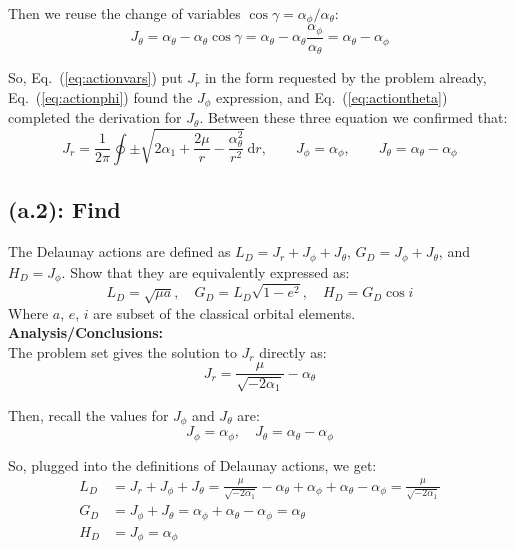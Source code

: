 \documentclass[titlepage]{article}
\begin{document}
Then we reuse the change of variables $\cos\gamma=\alpha_\phi/\alpha_\theta$:
\begin{equation}
	J_\theta=\alpha_\theta-\alpha_\theta\cos\gamma=\alpha_\theta-\alpha_\theta\frac{\alpha_\phi}{\alpha_\theta}=\alpha_\theta-\alpha_\phi
	\label{eq:actiontheta}
\end{equation}

\newpage

\begin{mdframed}[linewidth=1pt, innertopmargin=10pt, innerbottommargin=10pt]
	So, Eq.~(\ref{eq:actionvars}) put $J_r$ in the form requested by the problem already, Eq.~(\ref{eq:actionphi}) found the $J_\phi$ expression, and Eq.~(\ref{eq:actiontheta}) completed the derivation for $J_\theta$. Between these three equation we confirmed that:
	\begin{equation}
		J_r=\frac{1}{2\pi}\oint\pm\sqrt{2\alpha_1+\frac{2\mu}{r}-\frac{\alpha_\theta^2}{r^2}}\,\mathrm{d}r,\qquad J_\phi=\alpha_\phi,\qquad J_\theta=\alpha_\theta-\alpha_\phi
	\end{equation}
\end{mdframed}

\subsection*{(a.2): Find}

The Delaunay actions are defined as $L_D=J_r+J_\phi+J_\theta$, $G_D=J_\phi+J_\theta$, and $H_D=J_\phi$. Show that they are equivalently expressed as:
\begin{equation}
	L_D=\sqrt{\mu a},\quad G_D=L_D\sqrt{1-e^2},\quad H_D=G_D\cos i
\end{equation}
Where $a$, $e$, $i$ are subset of the classical orbital elements. \\

\textbf{Analysis/Conclusions:}\\

The problem set gives the solution to $J_r$ directly as:
\begin{equation}
	J_r=\frac{\mu}{\sqrt{-2\alpha_1}}-\alpha_\theta
\end{equation}

Then, recall the values for $J_\phi$ and $J_\theta$ are:
\begin{equation}
	J_\phi=\alpha_\phi,\quad J_\theta=\alpha_\theta-\alpha_\phi
\end{equation}

So, plugged into the definitions of Delaunay actions, we get:
\begin{equation}
	\begin{split}
		L_D&=J_r+J_\phi+J_\theta=\frac{\mu}{\sqrt{-2\alpha_1}}-\alpha_\theta+\alpha_\phi+\alpha_\theta-\alpha_\phi=\frac{\mu}{\sqrt{-2\alpha_1}} \\
		G_D&=J_\phi+J_\theta=\alpha_\phi+\alpha_\theta-\alpha_\phi=\alpha_\theta \\
		H_D&=J_\phi=\alpha_\phi
	\end{split}
\end{equation}
\end{document}
